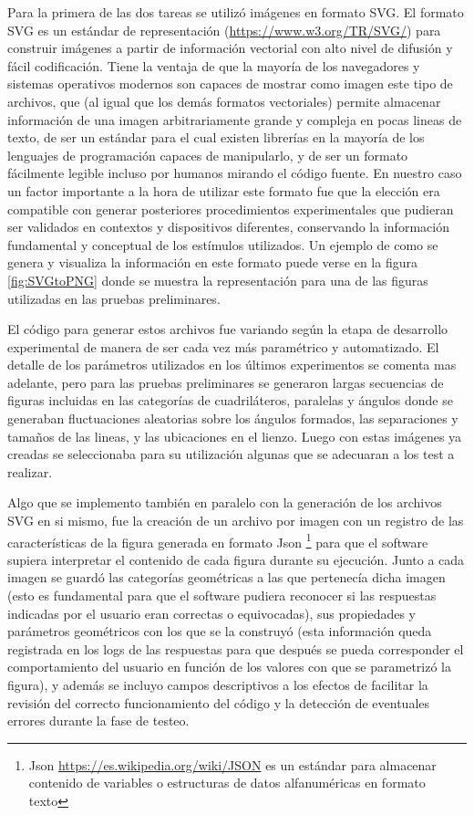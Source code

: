 \documentclass{article}
\begin{document}
    Para la primera de las dos tareas se utilizó imágenes en formato SVG. El formato SVG es un estándar de representación (\url{https://www.w3.org/TR/SVG/}) para construir imágenes a partir de información vectorial con alto nivel de difusión y fácil codificación. Tiene la ventaja de que la mayoría de los navegadores y sistemas operativos modernos son capaces de mostrar como imagen este tipo de archivos, que (al igual que los demás formatos vectoriales) permite almacenar información de una imagen arbitrariamente grande y compleja en pocas lineas de texto, de ser un estándar para el cual existen librerías en la mayoría de los lenguajes de programación capaces de manipularlo, y de ser un formato fácilmente legible incluso por humanos mirando el código fuente. En nuestro caso un factor importante a la hora de utilizar este formato fue que la elección era compatible con generar posteriores procedimientos experimentales que pudieran ser validados en contextos y dispositivos diferentes, conservando la información fundamental y conceptual de los estímulos utilizados. Un ejemplo de como se genera y visualiza la información en este formato puede verse en la figura \ref{fig:SVGtoPNG} donde se muestra la representación para una de las figuras utilizadas en las pruebas preliminares. 
    
    El código para generar estos archivos fue variando según la etapa de desarrollo experimental de manera de ser cada vez más paramétrico y automatizado. El detalle de los parámetros utilizados en los últimos experimentos se comenta mas adelante, pero para las pruebas preliminares se generaron largas secuencias de figuras incluidas en las categorías de cuadriláteros, paralelas y ángulos donde se generaban fluctuaciones aleatorias sobre los ángulos formados, las separaciones y tamaños de las lineas, y las ubicaciones en el lienzo. Luego con estas imágenes ya creadas se seleccionaba para su utilización algunas que se adecuaran a los test a realizar.
    
    Algo que se implemento también en paralelo con la generación de los archivos SVG en si mismo, fue la creación de un archivo por imagen con un registro de las características de la figura generada en formato Json \footnote{Json \url{https://es.wikipedia.org/wiki/JSON} es un estándar para almacenar contenido de variables o estructuras de datos alfanuméricas en formato texto} para que el software supiera interpretar el contenido de cada figura durante su ejecución. Junto a cada imagen se guardó las categorías geométricas a las que pertenecía dicha imagen (esto es fundamental para que el software pudiera reconocer si las respuestas indicadas por el usuario eran correctas o equivocadas), sus propiedades y parámetros geométricos con los que se la construyó (esta información queda registrada en los logs de las respuestas para que después se pueda corresponder el comportamiento del usuario en función de los valores con que se parametrizó la figura), y además se incluyo campos descriptivos a los efectos de facilitar la revisión del correcto funcionamiento del código y la detección de eventuales errores durante la fase de testeo. 
    
\end{document}
